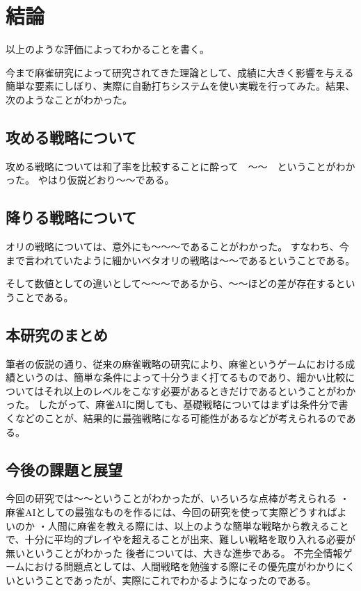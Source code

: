 \chapter{結論}
\label{chap:conclusion}

以上のような評価によってわかることを書く。

今まで麻雀研究によって研究されてきた理論として、成績に大きく影響を与える簡単な要素にしぼり、実際に自動打ちシステムを使い実戦を行ってみた。結果、次のようなことがわかった。

\section{攻める戦略について}

攻める戦略については和了率を比較することに酔って　〜〜　ということがわかった。
やはり仮説どおり〜〜である。

\section{降りる戦略について}

オリの戦略については、意外にも〜〜〜であることがわかった。
すなわち、今まで言われていたように細かいベタオリの戦略は〜〜であるということである。

そして数値としての違いとして〜〜〜であるから、〜〜ほどの差が存在するということである。

\section{本研究のまとめ}

筆者の仮説の通り、従来の麻雀戦略の研究により、麻雀というゲームにおける成績というのは、簡単な条件によって十分うまく打てるものであり、細かい比較についてはそれ以上のレベルをこなす必要があるときだけであるということがわかった。
したがって、麻雀AIに関しても、基礎戦略についてはまずは条件分で書くなどのことが、結果的に最強戦略になる可能性があるなどが考えられるのである。


\section{今後の課題と展望}

今回の研究では〜〜ということがわかったが、いろいろな点棒が考えられる
・麻雀AIとしての最強なものを作るには、今回の研究を使って実際どうすればよいのか
・人間に麻雀を教える際には、以上のような簡単な戦略から教えることで、十分に平均的プレイやを超えることが出来、難しい戦略を取り入れる必要が無いということがわかった
後者については、大きな進歩である。
不完全情報ゲームにおける問題点としては、人間戦略を勉強する際にその優先度がわかりにくいということであったが、実際にこれでわかるようになったのである。





